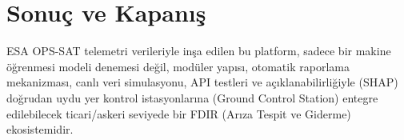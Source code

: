 \documentclass[conference,10pt]{IEEEtran}
\begin{document}
\section{Sonuç ve Kapanış}
ESA OPS-SAT telemetri verileriyle inşa edilen bu platform, sadece bir makine öğrenmesi modeli denemesi değil, modüler yapısı, otomatik raporlama mekanizması, canlı veri simulasyonu, API testleri ve açıklanabilirliğiyle (SHAP) doğrudan uydu yer kontrol istasyonlarına (Ground Control Station) entegre edilebilecek ticari/askeri seviyede bir FDIR (Arıza Tespit ve Giderme) ekosistemidir. 
\end{document}
